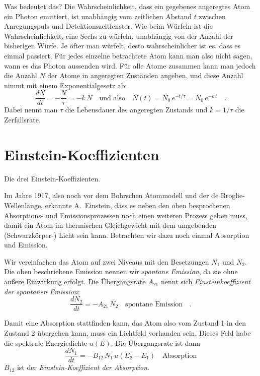 Was bedeutet das? Die Wahrscheinlichkeit, dass ein gegebenes angeregtes Atom ein Photon emittiert, ist unabhängig vom zeitlichen Abstand $t$ zwischen Anregungspuls und Detektionszeitfenster. Wie beim Würfeln ist die Wahrscheinlichkeit, eine Sechs zu würfeln, unabhängig von der Anzahl der bisherigen Würfe. Je öfter man würfelt, desto wahrscheinlicher ist es, dass es einmal passiert. Für jedes einzelne betrachtete Atom kann man also nicht sagen, wann es das Photon aussenden wird. Für alle Atome zusammen kann man jedoch die Anzahl $N$ der Atome in angeregten Zuständen angeben, und diese Anzahl nimmt mit einem Exponentialgesetz ab: 
\begin{equation}
    \frac{d N}{dt} = - \frac{N}{\tau}  = -k \, N \quad \text{und also} \quad N(t) =  N_0 \, e^{- t / \tau}  = N_0 \, e^{- k \, t }  \quad .
\end{equation} 
Dabei nennt man $\tau$ die Lebensdauer des angeregten Zustands und $k = 1 / \tau$ die Zerfallsrate.


\section{Einstein-Koeffizienten}


\begin{marginfigure}
    \caption{Die drei Einstein-Koeffizienten.}
\end{marginfigure}

Im Jahre 1917, also noch vor dem Bohrschen Atommodell und der de Broglie-Wellenlänge, erkannte A.~Einstein, dass es neben den oben besprochenen Absorptions- und Emissionsprozessen noch einen weiteren Prozess geben muss, damit ein Atom im thermischen Gleichgewicht mit dem umgebenden (Schwarzkörper-) Licht sein kann. Betrachten wir dazu noch einmal Absorption und Emission.

Wir vereinfachen das Atom auf zwei Niveaus mit den Besetzungen $N_1$ und $N_2$. Die oben beschriebene Emission nennen wir \emph{spontane Emission}, da sie ohne äußere Einwirkung erfolgt. Die Übergangsrate $A_{21}$ nennt sich \emph{Einsteinkoeffizient der spontanen Emission}:
\begin{equation}
    \frac{d N_2}{dt} = - A_{21} \, N_2  \quad \text{spontane Emission} \quad . \label{eq:7_k_spontan}
\end{equation}


Damit eine Absorption stattfinden kann, das Atom also vom Zustand 1 in den Zustand 2 übergehen kann, muss ein Lichtfeld vorhanden sein. Dieses Feld habe die spektrale Energiedichte $u(E)$. Die Übergangsrate ist dann
\begin{equation}
    \frac{d N_1}{dt} = - B_{12} \, N_1 \, u(E_2 - E_1) \quad \text{Absorption} \label{eq:7_k_abs}
\end{equation}
$B_{12}$ ist der \emph{Einstein-Koeffizient der Absorption}.

